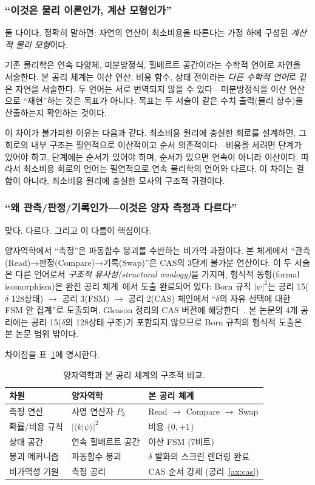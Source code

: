 \documentclass[entropy,article,submit,pdftex,oneauthor]{Definitions/mdpi}
\begin{document}
\subsubsection{``이것은 물리 이론인가, 계산 모형인가''}

둘 다이다. 정확히 말하면: 자연의 연산이 최소비용을 따른다는 가정 하에 구성된 \emph{계산적 물리 모형}이다.

기존 물리학은 연속 다양체, 미분방정식, 힐베르트 공간이라는 수학적 언어로 자연을 서술한다. 본 공리 체계는 이산 연산, 비용 함수, 상태 전이라는 \emph{다른 수학적 언어}로 같은 자연을 서술한다. 두 언어는 서로 번역되지 않을 수 있다---미분방정식을 이산 연산으로 ``재현''하는 것은 목표가 아니다. 목표는 두 서술이 같은 수치 출력(물리 상수)을 산출하는지 확인하는 것이다.

이 차이가 불가피한 이유는 다음과 같다. 최소비용 원리에 충실한 회로를 설계하면, 그 회로의 내부 구조는 필연적으로 이산적이고 순서 의존적이다---비용을 세려면 단계가 있어야 하고, 단계에는 순서가 있어야 하며, 순서가 있으면 연속이 아니라 이산이다. 따라서 최소비용 회로의 언어는 필연적으로 연속 물리학의 언어와 다르다. 이 차이는 결함이 아니라, 최소비용 원리에 충실한 모사의 구조적 귀결이다.

\subsubsection{``왜 관측/판정/기록인가---이것은 양자 측정과 다르다''}

맞다. 다르다. 그리고 이 다름이 핵심이다.

양자역학에서 ``측정''은 파동함수 붕괴를 수반하는 비가역 과정이다. 본 체계에서 ``관측(Read)→판정(Compare)→기록(Swap)''은 CAS의 3단계 불가분 연산이다. 이 두 서술은 다른 언어로서 \emph{구조적 유사성(structural analogy)}을 가지며, 형식적 동형(formal isomorphism)은 완전 공리 체계~\cite{han2026}에서 도출 완료되어 있다: Born 규칙 $|\psi|^2$는 공리 15($\delta$ 128상태) $\to$ 공리 3(FSM) $\to$ 공리 2(CAS) 체인에서 ``$\delta$의 자유 선택에 대한 FSM 안 집계''로 도출되며, Gleason 정리의 CAS 버전에 해당한다~\cite{han2026}. 본 논문의 4개 공리에는 공리 15($\delta$의 128상태 구조)가 포함되지 않으므로 Born 규칙의 형식적 도출은 본 논문 범위 밖이다.

차이점을 표~\ref{tab:qm-cas}에 명시한다.

\begin{table}[H]
\caption{양자역학과 본 공리 체계의 구조적 비교.\label{tab:qm-cas}}
\small
\begin{tabular}{lll}
\toprule
\textbf{차원} & \textbf{양자역학} & \textbf{본 공리 체계} \\
\midrule
측정 연산 & 사영 연산자 $P_k$ & Read $\to$ Compare $\to$ Swap \\
확률/비용 규칙 & $|\langle k|\psi\rangle|^2$ & 비용 $\{0, +1\}$ \\
상태 공간 & 연속 힐베르트 공간 & 이산 FSM (7비트) \\
붕괴 메커니즘 & 파동함수 붕괴 & $\delta$ 발화의 스크린 렌더링 완료 \\
비가역성 기원 & 측정 공리 & CAS 순서 강제 (공리~\ref{ax:cas}) \\
\bottomrule
\end{tabular}
\end{table}
\end{document}
